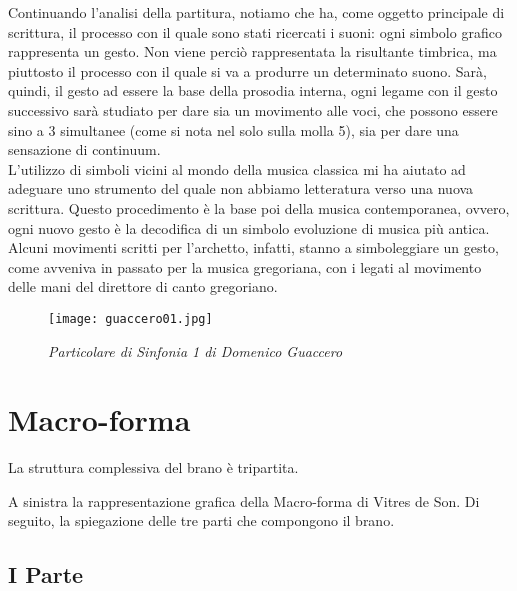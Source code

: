 \clearpage

Continuando l'analisi della partitura, notiamo che ha, come oggetto principale di scrittura, il processo con il quale sono stati ricercati i suoni: ogni simbolo grafico rappresenta un gesto. Non viene perciò rappresentata la risultante timbrica, ma piuttosto il processo con il quale si va a produrre un determinato suono. Sarà, quindi, il gesto ad essere la base della prosodia interna, ogni legame con il gesto successivo sarà studiato per dare sia un movimento alle voci, che possono essere sino a 3 simultanee (come si nota nel solo sulla molla 5), sia per dare una sensazione di continuum. \\
L'utilizzo di simboli vicini al mondo della musica classica mi ha aiutato ad adeguare uno strumento del quale non abbiamo letteratura verso una nuova scrittura. Questo procedimento è la base poi della musica contemporanea, ovvero, ogni nuovo gesto è la decodifica di un simbolo evoluzione di musica più antica. \\
Alcuni movimenti scritti per l'archetto, infatti, stanno a simboleggiare un gesto, come avveniva in passato per la musica gregoriana, con i  legati al movimento delle mani del direttore di canto gregoriano.
\begin{figure}[!h]
\begin{center}
\texttt{[image: guaccero01.jpg]}
\caption{\textit{Particolare di Sinfonia 1 di Domenico Guaccero}}
\label{default}
\end{center}
\end{figure}


\section{Macro-forma}


La struttura complessiva del brano è tripartita. 

A sinistra la rappresentazione grafica della Macro-forma di Vitres de Son. Di seguito, la spiegazione delle tre parti che compongono il brano.

\subsection*{I Parte}

